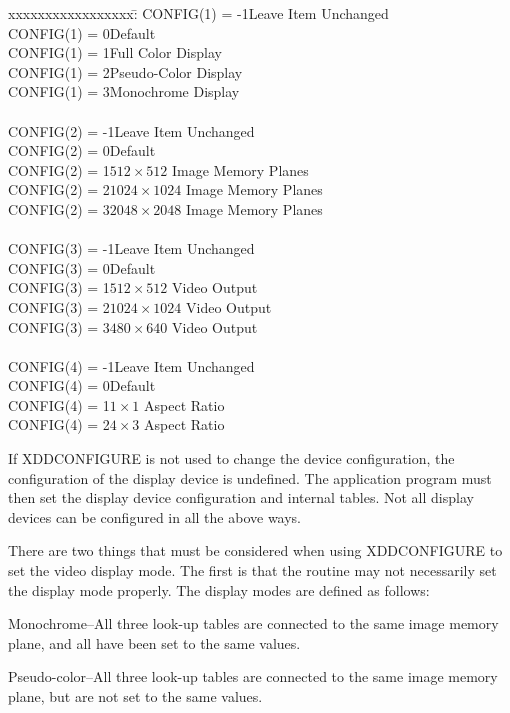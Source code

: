 \begin{tabbing}
xxxxxxxxxxxxxxxxx:\=\kill
CONFIG(1) = -1\>Leave Item Unchanged\\
CONFIG(1) =  0\>Default\\
CONFIG(1) =  1\>Full Color Display\\
CONFIG(1) =  2\>Pseudo-Color Display\\
CONFIG(1) =  3\>Monochrome Display\\
\\
CONFIG(2) = -1\>Leave Item Unchanged\\
CONFIG(2) =  0\>Default\\
CONFIG(2) =  1\>$512 \times 512$   Image Memory Planes\\
CONFIG(2) =  2\>$1024 \times 1024$ Image Memory Planes\\
CONFIG(2) =  3\>$2048 \times 2048$ Image Memory Planes\\
\\
CONFIG(3) = -1\>Leave Item Unchanged\\
CONFIG(3) =  0\>Default\\
CONFIG(3) =  1\>$512 \times 512$   Video Output\\
CONFIG(3) =  2\>$1024 \times 1024$ Video Output\\
CONFIG(3) =  3\>$480 \times 640$   Video Output\\
\\
CONFIG(4) = -1\>Leave Item Unchanged\\
CONFIG(4) =  0\>Default\\
CONFIG(4) =  1\>$1 \times 1$ Aspect Ratio\\
CONFIG(4) =  2\>$4 \times 3$ Aspect Ratio\\
\end{tabbing}
If XDDCONFIGURE is not used to change the device configuration, the
configuration of the display device is undefined.  The application
program must then set the display device configuration and internal tables.
Not all display devices can be configured in all the above ways.

There are two things that must be considered when using XDDCONFIGURE to
set the video display mode.  The first is that the routine may not
necessarily set the display mode properly.  The display modes are defined
as follows:

Monochrome--All three look-up tables are connected to the same image
memory plane, and all have been set to the same values.

Pseudo-color--All three look-up tables are connected to the same image
memory plane, but are not set to the same values.

